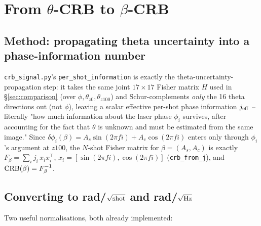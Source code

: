 \documentclass[11pt,a4paper]{article}
\newcommand{\code}[1]{\texttt{#1}}
\begin{document}
\section{From $\theta$-CRB to $\beta$-CRB}
\label{sec:beta}

\subsection{Method: propagating theta uncertainty into a phase-information number}
\label{sec:beta-method}

\code{crb\_signal.py}'s \code{per\_shot\_information} is exactly the
theta-uncertainty-propagation step: it takes the same joint $17\times17$
Fisher matrix $H$ used in \S\ref{sec:comparison} (over
$\phi,\theta_{z0},\theta_{z100}$) and Schur-complements \emph{only} the 16
theta directions out (not $\phi$), leaving a scalar effective per-shot phase
information $j_{\rm eff}$ -- literally "how much information about the laser
phase $\phi_i$ survives, after accounting for the fact that $\theta$ is
unknown and must be estimated from the same image." Since
$\delta\phi_i(\beta)=A_s\sin(2\pi f i)+A_c\cos(2\pi f i)$ enters only through
$\phi_i$'s argument at $z100$, the $N$-shot Fisher matrix for
$\beta=(A_s,A_c)$ is exactly $F_\beta=\sum_i j_i\,x_ix_i^\top$,
$x_i=[\sin(2\pi fi),\cos(2\pi fi)]$ (\code{crb\_from\_j}), and
${\rm CRB}(\beta)=F_\beta^{-1}$.

\subsection{Converting to rad/$\sqrt{\rm shot}$ and rad/$\sqrt{\rm Hz}$}
\label{sec:units}

Two useful normalisations, both already implemented:
\end{document}
